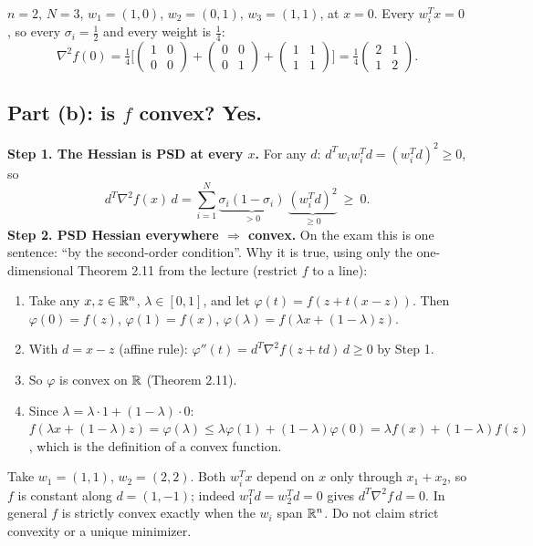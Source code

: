 \begin{example}
$n=2$, $N=3$, $w_1=(1,0)$, $w_2=(0,1)$, $w_3=(1,1)$, at $x=0$. Every $w_i^Tx=0$, so every $\sigma_i=\tfrac12$ and every weight is $\tfrac14$:
\[ \nabla^2f(0)=\tfrac14\Big[\begin{pmatrix}1&0\\0&0\end{pmatrix}+\begin{pmatrix}0&0\\0&1\end{pmatrix}+\begin{pmatrix}1&1\\1&1\end{pmatrix}\Big]=\tfrac14\begin{pmatrix}2&1\\1&2\end{pmatrix}. \]
\end{example}

\subsection*{Part (b): is $f$ convex? Yes.}
\textbf{Step 1. The Hessian is PSD at every $x$.} For any $d$: $d^Tw_iw_i^Td=(w_i^Td)^2\ge0$, so
\[ d^T\nabla^2f(x)\,d=\sum_{i=1}^N\underbrace{\sigma_i(1-\sigma_i)}_{>0}\ \underbrace{(w_i^Td)^2}_{\ge0}\ \ge\ 0. \]
\textbf{Step 2. PSD Hessian everywhere $\Rightarrow$ convex.} On the exam this is one sentence: ``by the second-order condition''. Why it is true, using only the
one-dimensional Theorem 2.11 from the lecture (restrict $f$ to a line):
\begin{enumerate}
  \item Take any $x,z\in\mathbb{R}^n$, $\lambda\in[0,1]$, and let $\varphi(t)=f(z+t(x-z))$. Then $\varphi(0)=f(z)$, $\varphi(1)=f(x)$, $\varphi(\lambda)=f(\lambda x+(1-\lambda)z)$.
  \item With $d=x-z$ (affine rule): $\varphi''(t)=d^T\nabla^2f(z+td)\,d\ge0$ by Step 1.
  \item So $\varphi$ is convex on $\mathbb{R}$ (Theorem 2.11).
  \item Since $\lambda=\lambda\cdot1+(1-\lambda)\cdot0$: $f(\lambda x+(1-\lambda)z)=\varphi(\lambda)\le\lambda\varphi(1)+(1-\lambda)\varphi(0)=\lambda f(x)+(1-\lambda)f(z)$,
        which is the definition of a convex function.
\end{enumerate}

\begin{pitfall}
Take $w_1=(1,1)$, $w_2=(2,2)$. Both $w_i^Tx$ depend on $x$ only through $x_1+x_2$, so $f$ is constant along $d=(1,-1)$; indeed $w_1^Td=w_2^Td=0$ gives $d^T\nabla^2f\,d=0$.
In general $f$ is strictly convex exactly when the $w_i$ span $\mathbb{R}^n$. Do not claim strict convexity or a unique minimizer.
\end{pitfall}

